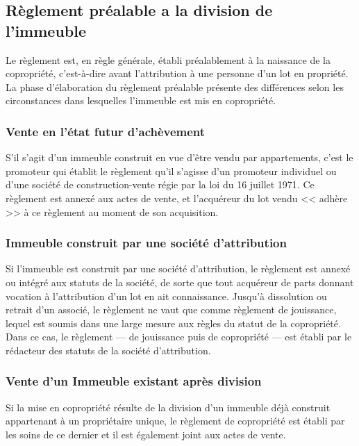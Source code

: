 	\subsection{Règlement préalable a la division de l’immeuble}
	
		Le règlement est, en règle générale, établi préalablement à la naissance de la copropriété, c'est-à-dire avant l'attribution à une personne d'un lot en propriété. La phase d'élaboration du règlement préalable présente des différences selon les circonstances dans lesquelles l'immeuble est mis en copropriété.
		
		\subsubsection{Vente en l'état futur d'achèvement}
		
			S'il s'agit d'un immeuble construit en vue d'être vendu par appartements, c'est le promoteur
			qui établit le règlement qu'il s'agisse d'un promoteur individuel ou d'une société de construction-vente régie par la loi du 16 juillet 1971. Ce règlement est annexé aux actes de vente, et l'acquéreur du lot vendu << adhère >> à ce règlement au moment de son acquisition.

		\subsubsection{Immeuble construit par une société d'attribution}
		
			Si l'immeuble est construit par une société d'attribution, le règlement est annexé ou intégré aux statuts de la société, de sorte que tout acquéreur de parts donnant vocation à l'attribution d'un lot en ait connaissance. Jusqu'à dissolution ou retrait d'un associé, le règlement ne vaut que comme règlement de jouissance, lequel est soumis dans une large mesure aux règles du statut de la copropriété. Dans ce cas, le règlement --- de jouissance puis de copropriété --- est établi par le rédacteur des statuts de la société d'attribution.
			
		\subsubsection{Vente d'un Immeuble existant après division}
		
			Si la mise en copropriété résulte de la division d'un immeuble déjà construit appartenant à un propriétaire unique, le règlement de copropriété est établi par les soins de ce dernier et il est également joint aux actes de vente.
			
